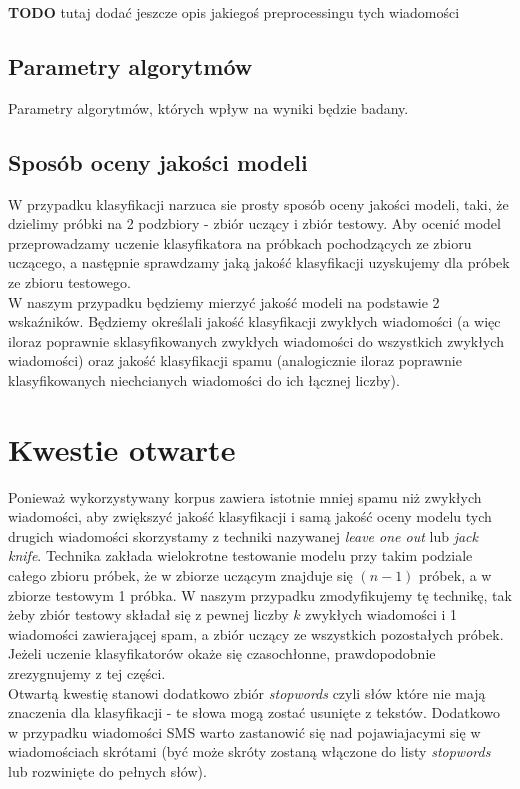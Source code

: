 \documentclass[a4paper,12pt]{article}
\begin{document}
\textbf{TODO} tutaj dodać jeszcze opis jakiegoś preprocessingu tych wiadomości

\subsection{Parametry algorytmów}

Parametry algorytmów, których wpływ na wyniki będzie badany.

\subsection{Sposób oceny jakości modeli}

W przypadku klasyfikacji narzuca sie prosty sposób oceny jakości modeli, taki, że dzielimy próbki na 2 podzbiory - zbiór uczący i zbiór testowy. Aby ocenić model przeprowadzamy uczenie klasyfikatora na próbkach pochodzących ze zbioru uczącego, a następnie sprawdzamy jaką jakość klasyfikacji uzyskujemy dla próbek ze zbioru testowego.\\

W naszym przypadku będziemy mierzyć jakość modeli na podstawie 2 wskaźników. Będziemy określali jakość klasyfikacji zwykłych wiadomości (a więc iloraz poprawnie sklasyfikowanych zwykłych wiadomości do wszystkich zwykłych wiadomości) oraz jakość klasyfikacji spamu (analogicznie iloraz poprawnie klasyfikowanych niechcianych wiadomości do ich łącznej liczby).\\

\section{Kwestie otwarte}

Ponieważ wykorzystywany korpus zawiera istotnie mniej spamu niż zwykłych wiadomości, aby zwiększyć jakość klasyfikacji i samą jakość oceny modelu tych drugich wiadomości skorzystamy z techniki nazywanej \textit{leave one out} lub \textit{jack knife}. Technika zakłada wielokrotne testowanie modelu przy takim podziale całego
zbioru próbek, że w zbiorze uczącym znajduje się $(n-1)$ próbek, a w zbiorze testowym 1 próbka. W naszym przypadku zmodyfikujemy tę technikę, tak żeby zbiór testowy składał się z pewnej liczby $k$ zwykłych wiadomości i 1 wiadomości zawierającej spam, a zbiór uczący ze wszystkich pozostałych próbek. Jeżeli uczenie klasyfikatorów okaże się czasochłonne, prawdopodobnie zrezygnujemy z tej części.\\

Otwartą kwestię stanowi dodatkowo zbiór \textit{stopwords} czyli słów które nie mają znaczenia dla klasyfikacji - te słowa mogą zostać usunięte z tekstów. Dodatkowo w przypadku wiadomości SMS warto zastanowić się nad pojawiajacymi się w wiadomościach skrótami (być może skróty zostaną włączone do listy \textit{stopwords} lub rozwinięte do pełnych słów).
\end{document}
